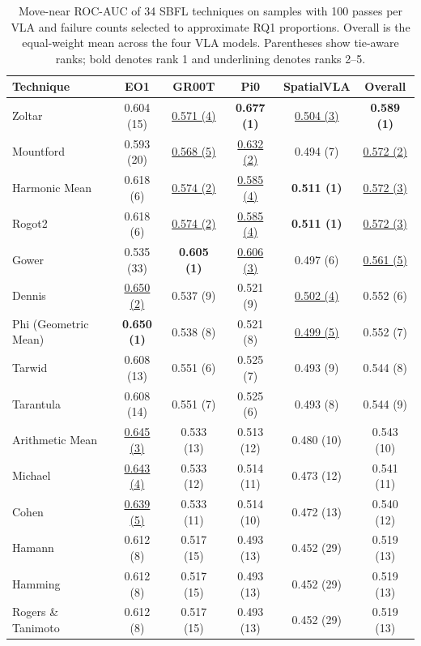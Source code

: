 \begin{table}[t]
\centering
\caption{Move-near ROC-AUC of 34 SBFL techniques on samples with 100 passes per VLA and failure counts selected to approximate RQ1 proportions. Overall is the equal-weight mean across the four VLA models. Parentheses show tie-aware ranks; bold denotes rank 1 and underlining denotes ranks 2--5.}
\label{tab:rq5-transfer-roc-auc}
{\scriptsize
\setlength{\tabcolsep}{4pt}
\renewcommand{\arraystretch}{0.96}
\begin{tabular}{lccccc}
\toprule
Technique & EO1 & GR00T & Pi0 & SpatialVLA & Overall \\
\midrule
Zoltar & 0.604 (15) & \underline{0.571 (4)} & \textbf{0.677 (1)} & \underline{0.504 (3)} & \textbf{0.589 (1)} \\
Mountford & 0.593 (20) & \underline{0.568 (5)} & \underline{0.632 (2)} & 0.494 (7) & \underline{0.572 (2)} \\
Harmonic Mean & 0.618 (6) & \underline{0.574 (2)} & \underline{0.585 (4)} & \textbf{0.511 (1)} & \underline{0.572 (3)} \\
Rogot2 & 0.618 (6) & \underline{0.574 (2)} & \underline{0.585 (4)} & \textbf{0.511 (1)} & \underline{0.572 (3)} \\
Gower & 0.535 (33) & \textbf{0.605 (1)} & \underline{0.606 (3)} & 0.497 (6) & \underline{0.561 (5)} \\
Dennis & \underline{0.650 (2)} & 0.537 (9) & 0.521 (9) & \underline{0.502 (4)} & 0.552 (6) \\
Phi (Geometric Mean) & \textbf{0.650 (1)} & 0.538 (8) & 0.521 (8) & \underline{0.499 (5)} & 0.552 (7) \\
Tarwid & 0.608 (13) & 0.551 (6) & 0.525 (7) & 0.493 (9) & 0.544 (8) \\
Tarantula & 0.608 (14) & 0.551 (7) & 0.525 (6) & 0.493 (8) & 0.544 (9) \\
Arithmetic Mean & \underline{0.645 (3)} & 0.533 (13) & 0.513 (12) & 0.480 (10) & 0.543 (10) \\
Michael & \underline{0.643 (4)} & 0.533 (12) & 0.514 (11) & 0.473 (12) & 0.541 (11) \\
Cohen & \underline{0.639 (5)} & 0.533 (11) & 0.514 (10) & 0.472 (13) & 0.540 (12) \\
Hamann & 0.612 (8) & 0.517 (15) & 0.493 (13) & 0.452 (29) & 0.519 (13) \\
Hamming & 0.612 (8) & 0.517 (15) & 0.493 (13) & 0.452 (29) & 0.519 (13) \\
Rogers \& Tanimoto & 0.612 (8) & 0.517 (15) & 0.493 (13) & 0.452 (29) & 0.519 (13) \\

\end{tabular}}
\end{table}
